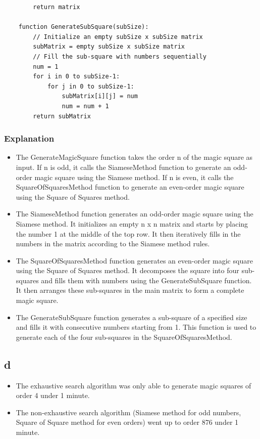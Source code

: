 \documentclass{article}
\begin{document}
\begin{verbatim}
        return matrix
    
    function GenerateSubSquare(subSize):
        // Initialize an empty subSize x subSize matrix
        subMatrix = empty subSize x subSize matrix
        // Fill the sub-square with numbers sequentially
        num = 1
        for i in 0 to subSize-1:
            for j in 0 to subSize-1:
                subMatrix[i][j] = num
                num = num + 1
        return subMatrix
    \end{verbatim}

\subsubsection*{Explanation}
\begin{itemize}
    \item The GenerateMagicSquare function takes the order n of the magic square as input.
          If n is odd, it calls the SiameseMethod function to generate an odd-order magic square
          using the Siamese method. If n is even, it calls the SquareOfSquaresMethod function to
          generate an even-order magic square using the Square of Squares method.

    \item The SiameseMethod function generates an odd-order magic square using the Siamese method.
          It initializes an empty n x n matrix and starts by placing the number 1 at the middle of the
          top row. It then iteratively fills in the numbers in the matrix according to the Siamese
          method rules.

    \item The SquareOfSquaresMethod function generates an even-order magic square using the Square
          of Squares method. It decomposes the square into four sub-squares and fills them with numbers
          using the GenerateSubSquare function. It then arranges these sub-squares in the main matrix
          to form a complete magic square.

    \item The GenerateSubSquare function generates a sub-square of a specified size and fills it with
          consecutive numbers starting from 1. This function is used to generate each of the four
          sub-squares in the SquareOfSquaresMethod.
\end{itemize}

\subsection*{d}
\begin{itemize}
\item The exhaustive search algorithm was only able to generate magic squares of order 4 under 1 minute.
\item The non-exhaustive search algorithm (Siamese method for odd numbers, Square of Square method for even orders)
went up to order 876 under 1 minute.

\end{itemize}




\newpage
\end{document}
